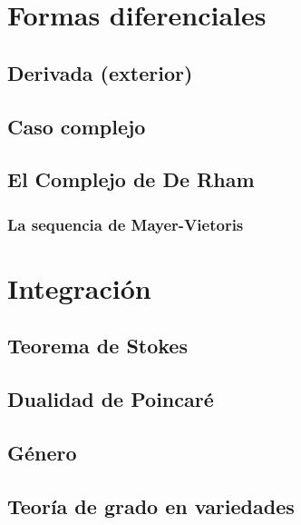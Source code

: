 \documentclass[12pt]{book}
\begin{document}
\chapter{Formas diferenciales}

\section{Derivada (exterior)}

\section{Caso complejo}

\section{El Complejo de De Rham}




\subsection{La sequencia de Mayer-Vietoris}






\chapter{Integración}

\section{Teorema de Stokes}


\section{Dualidad de Poincaré}


\section{Género}

\section{Teoría de grado en variedades}
\end{document}
